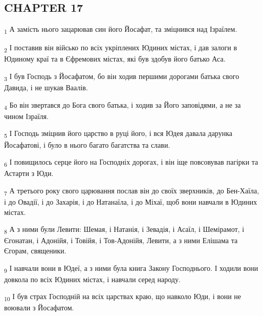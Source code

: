 \subsection{CHAPTER 17}
\begin{tcolorbox}
\textsubscript{1} А замість нього зацарював син його Йосафат, та зміцнився над Ізраїлем.
\end{tcolorbox}
\begin{tcolorbox}
\textsubscript{2} І поставив він військо по всіх укріплених Юдиних містах, і дав залоги в Юдиному краї та в Єфремових містах, які був здобув його батько Аса.
\end{tcolorbox}
\begin{tcolorbox}
\textsubscript{3} І був Господь з Йосафатом, бо він ходив першими дорогами батька свого Давида, і не шукав Ваалів.
\end{tcolorbox}
\begin{tcolorbox}
\textsubscript{4} Бо він звертався до Бога свого батька, і ходив за Його заповідями, а не за чином Ізраїля.
\end{tcolorbox}
\begin{tcolorbox}
\textsubscript{5} І Господь зміцнив його царство в руці його, і вся Юдея давала дарунка Йосафатові, і було в нього багато багатства та слави.
\end{tcolorbox}
\begin{tcolorbox}
\textsubscript{6} І повищилось серце його на Господніх дорогах, і він іще повсовував пагірки та Астарти з Юди.
\end{tcolorbox}
\begin{tcolorbox}
\textsubscript{7} А третього року свого царювання послав він до своїх зверхників, до Бен-Хаїла, і до Овадії, і до Захарія, і до Натанаїла, і до Міхаї, щоб вони навчали в Юдиних містах.
\end{tcolorbox}
\begin{tcolorbox}
\textsubscript{8} А з ними були Левити: Шемая, і Натанія, і Зевадія, і Асаїл, і Шемірамот, і Єгонатан, і Адонійя, і Товійя, і Тов-Адонійя, Левити, а з ними Елішама та Єгорам, священики.
\end{tcolorbox}
\begin{tcolorbox}
\textsubscript{9} І навчали вони в Юдеї, а з ними була книга Закону Господнього. І ходили вони довкола по всіх Юдиних містах, і навчали серед народу.
\end{tcolorbox}
\begin{tcolorbox}
\textsubscript{10} І був страх Господній на всіх царствах краю, що навколо Юди, і вони не воювали з Йосафатом.
\end{tcolorbox}
